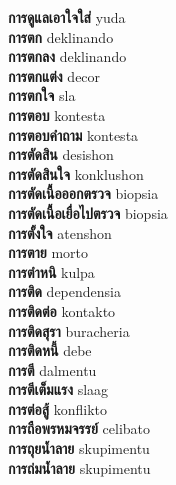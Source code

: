 \textbf{ การดูแลเอาใจใส่  } yuda \\
\textbf{ การตก  } deklinando \\
\textbf{ การตกลง  } deklinando \\
\textbf{ การตกแต่ง  } decor \\
\textbf{ การตกใจ  } sla \\
\textbf{ การตอบ  } kontesta \\
\textbf{ การตอบคำถาม  } kontesta \\
\textbf{ การตัดสิน  } desishon \\
\textbf{ การตัดสินใจ  } konklushon \\
\textbf{ การตัดเนื้อออกตรวจ  } biopsia \\
\textbf{ การตัดเนื้อเยื่อไปตรวจ  } biopsia \\
\textbf{ การตั้งใจ  } atenshon \\
\textbf{ การตาย  } morto \\
\textbf{ การตำหนิ  } kulpa \\
\textbf{ การติด  } dependensia \\
\textbf{ การติดต่อ  } kontakto \\
\textbf{ การติดสุรา  } buracheria \\
\textbf{ การติดหนี้  } debe \\
\textbf{ การตี  } dalmentu \\
\textbf{ การตีเต็มแรง  } slaag \\
\textbf{ การต่อสู้  } konflikto \\
\textbf{ การถือพรหมจรรย์  } celibato \\
\textbf{ การถุยน้ำลาย  } skupimentu \\
\textbf{ การถ่มน้ำลาย  } skupimentu \\
